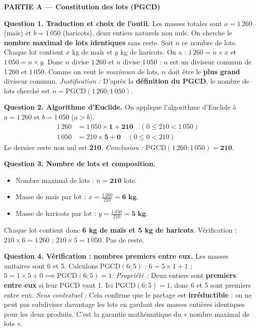 \documentclass[11pt]{article}
\newcommand{\cle}[1]{{\popxbold\color{popdark}#1}}
\newcounter{popsec}
\newcounter{popsub}
\newcommand{\courssub}[1]{%
  \stepcounter{popsub}%
  \par\vspace{9pt}\noindent{\popxbold\fontsize{11.5}{13}\selectfont\color{popink}{\color{poporange}\thepopsec.\thepopsub}\hspace{6pt}#1}\par\nopagebreak\vspace{4pt}
}
\begin{document}
\courssub{Démarche et corrigé commenté}
\begin{exoresolu}
\textbf{PARTIE A — Constitution des lots (PGCD)}

\noindent \textbf{Question 1. Traduction et choix de l'outil.}
Les masses totales sont $a = 1\,260$ (maïs) et $b = 1\,050$ (haricots), deux entiers naturels non nuls.
On cherche le \textbf{nombre maximal de lots identiques} sans reste. Soit $n$ ce nombre de lots. Chaque lot contient $x$ kg de maïs et $y$ kg de haricots.
On a : $1\,260 = n \times x$ et $1\,050 = n \times y$.
Donc $n$ divise $1\,260$ et $n$ divise $1\,050$ : $n$ est un \cle{diviseur commun} de 1\,260 et 1\,050.
Comme on veut le \emph{maximum} de lots, $n$ doit être le \textbf{plus grand} diviseur commun.
\emph{Justification :} D'après la \textbf{définition du PGCD}, le nombre de lots cherché est $n = \text{PGCD}(1\,260 ; 1\,050)$.

\noindent \textbf{Question 2. Algorithme d'Euclide.}
On applique l'algorithme d'Euclide à $a=1\,260$ et $b=1\,050$ ($a > b$).
\begin{align*}
1\,260 &= 1\,050 \times \mathbf{1} + \mathbf{210} \quad (0 \le 210 < 1\,050) \\
1\,050 &= 210 \times \mathbf{5} + \mathbf{0} \quad (0 \le 0 < 210)
\end{align*}
Le dernier reste non nul est \textbf{210}.
\emph{Conclusion :} $\text{PGCD}(1\,260 ; 1\,050) = \mathbf{210}$.

\noindent \textbf{Question 3. Nombre de lots et composition.}
\begin{itemize}
    \item Nombre maximal de lots : $n = \mathbf{210}$ lots.
    \item Masse de maïs par lot : $x = \frac{1\,260}{210} = \mathbf{6 \text{ kg}}$.
    \item Masse de haricots par lot : $y = \frac{1\,050}{210} = \mathbf{5 \text{ kg}}$.
\end{itemize}
Chaque lot contient donc \textbf{6 kg de maïs et 5 kg de haricots}. Vérification : $210 \times 6 = 1\,260$ ; $210 \times 5 = 1\,050$. Pas de reste.

\noindent \textbf{Question 4. Vérification : nombres premiers entre eux.}
Les masses unitaires sont 6 et 5.
Calculons $\text{PGCD}(6 ; 5)$ :
$6 = 5 \times 1 + 1$ ; $5 = 1 \times 5 + 0 \implies \text{PGCD}(6;5) = 1$.
\emph{Propriété :} Deux entiers sont \textbf{premiers entre eux} si leur PGCD vaut 1.
Ici $\text{PGCD}(6;5)=1$, donc 6 et 5 sont premiers entre eux.
\emph{Sens contextuel :} Cela confirme que le partage est \textbf{irréductible} : on ne peut pas subdiviser davantage les lots en gardant des masses entières identiques pour les deux produits. C'est la garantie mathématique du « nombre maximal de lots ».


\end{exoresolu}
\end{document}
